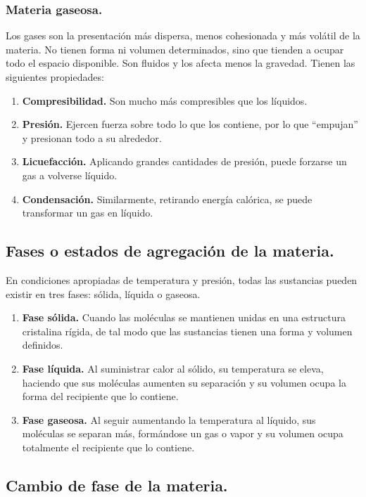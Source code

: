 \documentclass[14pt]{extarticle}
\begin{document}
\subsubsection{Materia gaseosa.}

Los gases son la presentación más dispersa, menos cohesionada y más volátil de la materia. No tienen forma ni volumen determinados, sino que tienden a ocupar todo el espacio disponible. Son fluidos y los afecta menos la gravedad. Tienen las siguientes propiedades:

\begin{enumerate}
\item \textbf{Compresibilidad.} Son mucho más compresibles que los líquidos.
\item \textbf{Presión.} Ejercen fuerza sobre todo lo que los contiene, por lo que “empujan” y presionan todo a su alrededor.
\item \textbf{Licuefacción.} Aplicando grandes cantidades de presión, puede forzarse un gas a volverse líquido.
\item \textbf{Condensación.} Similarmente, retirando energía calórica, se puede transformar un gas en líquido.
\end{enumerate}

\subsection{Fases o estados de agregación de la materia.}

En condiciones apropiadas de temperatura y presión, todas las sustancias pueden existir en tres
fases: sólida, líquida o gaseosa.

\begin{enumerate}
\item \textbf{Fase sólida.} Cuando las moléculas se mantienen unidas en una estructura cristalina rígida, de tal modo que las sustancias tienen una forma y volumen definidos.
\item \textbf{Fase líquida.} Al suministrar calor al sólido, su temperatura se eleva, haciendo que sus moléculas aumenten su separación y su volumen ocupa la forma del recipiente que lo contiene.
\item \textbf{Fase gaseosa.} Al seguir aumentando la temperatura al líquido, sus moléculas se separan más, formándose un gas o vapor y su volumen ocupa totalmente el recipiente que lo contiene.
\end{enumerate}

\subsection{Cambio de fase de la materia.}
\end{document}
